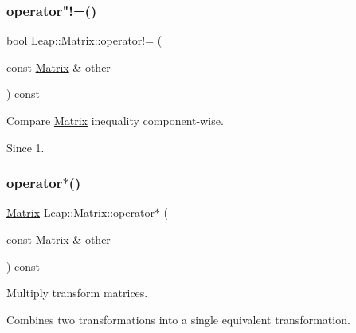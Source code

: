 \subsubsection{\texorpdfstring{operator"!=()}{operator!=()}}
{\footnotesize\ttfamily bool Leap\+::\+Matrix\+::operator!= (\begin{DoxyParamCaption}\item[{const \hyperlink{struct_leap_1_1_matrix}{Matrix} \&}]{other }\end{DoxyParamCaption}) const\hspace{0.3cm}{\ttfamily [inline]}}

Compare \hyperlink{struct_leap_1_1_matrix}{Matrix} inequality component-\/wise.


\begin{DoxyCodeInclude}
\end{DoxyCodeInclude}


\begin{DoxySince}{Since}
1. 
\end{DoxySince}
\mbox{\label{struct_leap_1_1_matrix_a6d695143ff17c54a421280aee585da6a}} 
\subsubsection{\texorpdfstring{operator$\ast$()}{operator*()}}
{\footnotesize\ttfamily \hyperlink{struct_leap_1_1_matrix}{Matrix} Leap\+::\+Matrix\+::operator$\ast$ (\begin{DoxyParamCaption}\item[{const \hyperlink{struct_leap_1_1_matrix}{Matrix} \&}]{other }\end{DoxyParamCaption}) const\hspace{0.3cm}{\ttfamily [inline]}}

Multiply transform matrices.

Combines two transformations into a single equivalent transformation.


\begin{DoxyCodeInclude}
\end{DoxyCodeInclude}



